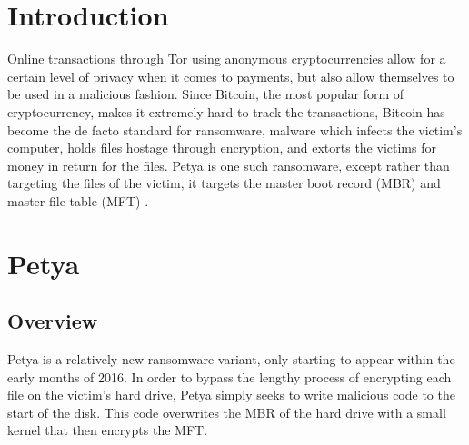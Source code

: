 \documentclass[twocolumn]{article}
\begin{document}

\section{Introduction}
\label{sec:introduction}
Online transactions through Tor \cite{tor} using anonymous cryptocurrencies allow for a certain level of privacy when it comes to payments, but also allow themselves to be used in a malicious fashion. Since Bitcoin, the most popular form of cryptocurrency, makes it extremely hard to track the transactions, Bitcoin has become the de facto standard for ransomware, malware which infects the victim's computer, holds files hostage through encryption, and extorts the victims for money in return for the files. Petya is one such ransomware, except rather than targeting the files of the victim, it targets the master boot record (MBR) and master file table (MFT) \cite{decryptPetya}.

\section{Petya}
\label{sec:petya}
\subsection{Overview}
Petya is a relatively new ransomware variant, only starting to appear within the early months of 2016. In order to bypass the lengthy process of encrypting each file on the victim's hard drive, Petya simply seeks to write malicious code to the start of the disk. This code overwrites the MBR of the hard drive with a small kernel that then encrypts the MFT. 
\end{document}
